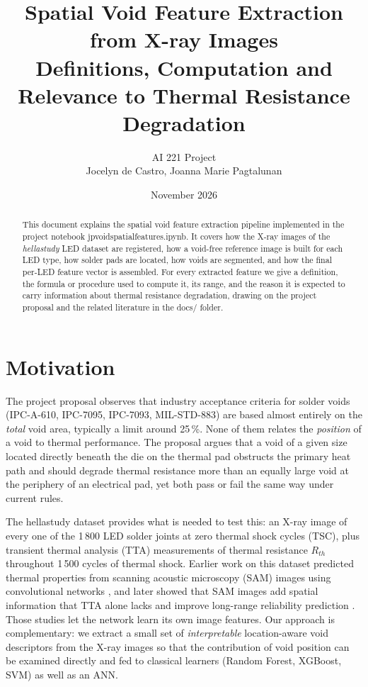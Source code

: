 \documentclass[11pt,a4paper]{article}
\title{Spatial Void Feature Extraction from X-ray Images\texorpdfstring{\\
\large Definitions, Computation and Relevance to Thermal Resistance Degradation}{: Definitions, Computation and Relevance to Thermal Resistance Degradation}}
\author{AI 221 Project \\ Jocelyn de Castro, Joanna Marie Pagtalunan}
\date{November 2026}
\newcommand{\code}[1]{{\ttfamily\def\_{\textunderscore\allowbreak}#1}}
\begin{document}
\maketitle

\begin{abstract}
This document explains the spatial void feature extraction pipeline implemented in the
project notebook \code{jp\_void\_spatial\_features.ipynb}. It covers how the X-ray images of the
\emph{hellastudy} LED dataset are registered, how a void-free reference image is built for each
LED type, how solder pads are located, how voids are segmented, and how the final per-LED
feature vector is assembled. For every extracted feature we give a definition, the formula or
procedure used to compute it, its range, and the reason it is expected to carry information
about thermal resistance degradation, drawing on the project proposal and the related
literature in the \code{docs/} folder.
\end{abstract}

\tableofcontents

\section{Motivation}

The project proposal \cite{proposal} observes that industry acceptance criteria for solder
voids (IPC-A-610, IPC-7095, IPC-7093, MIL-STD-883) are based almost entirely on the
\emph{total} void area, typically a limit around 25\,\%. None of them relates the
\emph{position} of a void to thermal performance. The proposal argues that a void of a given
size located directly beneath the die on the thermal pad obstructs the primary heat path and
should degrade thermal resistance more than an equally large void at the periphery of an
electrical pad, yet both pass or fail the same way under current rules.

The hellastudy dataset \cite{part1,part2} provides what is needed to test this: an X-ray image of
every one of the 1\,800 LED solder joints at zero thermal shock cycles (TSC), plus transient
thermal analysis (TTA) measurements of thermal resistance $R_{th}$ throughout 1\,500 cycles of
thermal shock. Earlier work on this dataset predicted thermal properties from scanning acoustic
microscopy (SAM) images using convolutional networks \cite{zippelius2022}, and later showed that
SAM images add spatial information that TTA alone lacks and improve long-range reliability
prediction \cite{zippelius2026}. Those studies let the network learn its own image features. Our
approach is complementary: we extract a small set of \emph{interpretable} location-aware void
descriptors from the X-ray images so that the contribution of void position can be examined
directly and fed to classical learners (Random Forest, XGBoost, SVM) as well as an ANN.
\end{document}

